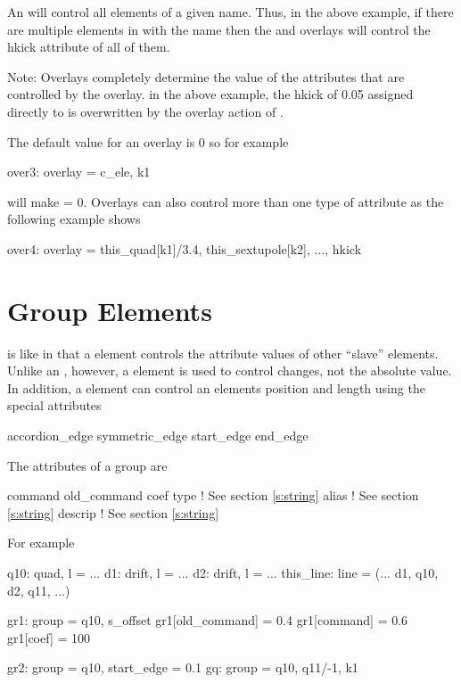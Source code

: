 An  will control all elements of a given name. 
Thus, in the above example, if there are multiple elements in  with 
the name  then the  and  overlays will control the hkick
attribute of all of them. 

Note: Overlays completely determine the value of the attributes that are controlled 
by the overlay. in the above example, the hkick of 0.05 assigned directly 
to  is overwritten by the overlay action of . 

The default value for an overlay is 0 so for example
\begin{example}
  over3: overlay = {c\_ele}, k1
\end{example}
will make  = 0. Overlays can also control more than one type of attribute
as the following example shows
\begin{example}
  over4: overlay = {this\_quad[k1]/3.4, this\_sextupole[k2], ...}, hkick
\end{example}


\section{Group Elements}
\label{s:group}
 
 is like  in that a  element controls the 
attribute values of other ``slave'' elements. Unlike an , however, 
a  element is used to control changes, not the absolute value. 
In addition, a  element can control an elements position and 
length using the special attributes
\begin{example}
  accordion\_edge
  symmetric\_edge  
  start_edge
  end\_edge
\end{example}
The attributes of a group are
\begin{example}
  command         
  old\_command     
  coef            
  type            ! See section \ref{s:string}
  alias           ! See section \ref{s:string}
  descrip         ! See section \ref{s:string}
\end{example}
For example
\begin{example}
  q10: quad, l = ...
  d1: drift, l = ...
  d2: drift, l = ...
  this\_line: line = (... d1, q10, d2, q11, ...)

  gr1: group = {q10}, s_offset
  gr1[old\_command] = 0.4
  gr1[command] = 0.6
  gr1[coef] = 100

  gr2: group = {q10}, start\_edge = 0.1
  gq: group = {q10, q11/-1}, k1
\end{example}

